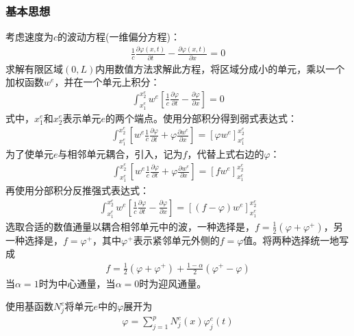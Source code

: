 \documentclass{article}
\numberwithin{equation}{section}
\begin{document}
\subsubsection{基本思想}
考虑速度为$c$的波动方程(一维偏分方程)：
\begin{align}
    \label{eq:eq791}
    \frac{1}{c}\frac{\partial\varphi(x,t)}{\partial t}-\frac{\partial\varphi(x,t)}{\partial x}=0
\end{align}
求解有限区域$(0,L)$内用数值方法求解此方程，将区域分成小的单元，乘以一个加权函数$w^e$，并在一个单元上积分：
\begin{align}
    \label{eq:eq792}
    \int_{x_1^e}^{x_2^e}w^e\left[\frac{1}{c}\frac{\partial\varphi}{\partial t}-\frac{\partial\varphi}{\partial x}\right]=0
\end{align}
式中，$x_1^e$和$x_2^e$表示单元$e$的两个端点。使用分部积分得到弱式表达式：
\begin{align}
    \label{eq:eq793}
    \int_{x_1^e}^{x_2^e}\left[w^e\frac{1}{c}\frac{\partial\varphi}{\partial t}+\varphi\frac{\partial w^e}{\partial x}\right]=\left[\varphi w^e\right]_{x_1^e}^{x_2^e}
\end{align}
为了使单元$e$与相邻单元耦合，引入\textbf{\color{blue}{数值通量}}，记为$f$，代替上式右边的$\varphi$：
\begin{align}
    \label{eq:eq794}
    \int_{x_1^e}^{x_2^e}\left[w^e\frac{1}{c}\frac{\partial\varphi}{\partial t}+\varphi\frac{\partial w^e}{\partial x}\right]=\left[f w^e\right]_{x_1^e}^{x_2^e}
\end{align}
再使用分部积分反推强式表达式：
\begin{align}
    \label{eq:eq795}
    \int_{x_1^e}^{x_2^e}w^e\left[\frac{1}{c}\frac{\partial\varphi}{\partial t}-\frac{\partial\varphi}{\partial x}\right]=\left[(f-\varphi) w^e\right]_{x_1^e}^{x_2^e}
\end{align}
选取合适的数值通量以耦合相邻单元中的波，一种选择是\textbf{\color{blue}{中心通量}}，$f=\frac{1}{2}(\varphi+\varphi^+)$，另一种选择是\textbf{\color{blue}{迎风通量}}，$f=\varphi^+$，其中$\varphi^+$表示紧邻单元外侧的$f=\varphi$值。将两种选择统一地写成
\begin{align}
    \label{eq:eq796}
    f=\frac{1}{2}(\varphi+\varphi^+)+\frac{1-\alpha}{2}(\varphi^+-\varphi)
\end{align}
当$\alpha=1$时为中心通量，当$\alpha=0$时为迎风通量。\par
使用基函数$N_j^e$将单元$e$中的$\varphi$展开为
\begin{align}
    \label{eq:eq797}
    \varphi=\sum_{j=1}^{p}N_j^e(x)\varphi_j^e(t)
\end{align}
\end{document}
